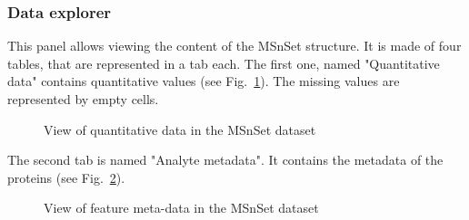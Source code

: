 \documentclass[12pt]{article}
\begin{document}
\subsubsection {Data explorer}\label{sec:dataexplorer}
This panel allows viewing the content of the MSnSet structure. It is made of four tables, that are represented in a tab each. %
The first one, named "Quantitative data" contains quantitative values (see Fig.~\ref{fig:sdqv1}). The missing values are represented by empty cells.

\begin {figure}
\centering
{}
\caption{View of quantitative data in the MSnSet dataset}\label{fig:sdqv1}
\end {figure}


The second tab is named "Analyte metadata". It contains the metadata of the proteins (see Fig.~\ref{fig:sdqv2}).

\begin {figure}
\centering
{}
\caption{View of feature meta-data in the MSnSet dataset}\label{fig:sdqv2}
\end {figure}
\end{document}
